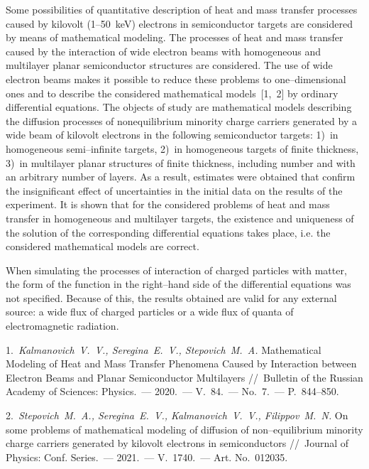 

\vzmscaption


Some possibilities of quantitative description of heat and mass transfer processes caused by kilovolt (1--50~keV) electrons in semiconductor targets are considered by means of ma\-the\-ma\-ti\-cal modeling. The processes of heat and mass transfer cau\-sed by the interaction of wide electron beams with homogeneous and multilayer planar semiconductor structures are considered. The use of wide electron beams makes it possible to reduce these problems to one--dimensional ones and to describe the con\-si\-de\-red mathematical models~[1,~2] by ordinary differential equations. The objects of study are mathematical models des\-cri\-bing the diffusion processes of nonequilibrium minority cha\-rge carriers generated by a wide beam of kilovolt electrons in the following semiconductor targets: 1)~in homogeneous semi--in\-fi\-nite targets, 2)~in homogeneous targets of finite thickness, 3)~in multilayer planar structures of finite thickness, including number and with an arbitrary number of layers. As a result, estimates were ob\-tai\-ned that confirm the insignificant effect of un\-cer\-tain\-ties in the initial data on the results of the experiment. It is shown that for the considered problems of heat and mass transfer in homogeneous and multilayer targets, the existence and uni\-que\-ness of the solution of the corresponding differential equations takes place, i.e. the considered mathematical models are correct.

When simulating the processes of interaction of char\-ged particles with matter, the form of the function in the right--hand side of the differential equations was not specified. Because of this, the results obtained are valid for any external source: a wide flux of charged particles or a wide flux of quanta of electromagnetic radiation.


\litlist


1.~{\it Kalmanovich~V.~V., Seregina~E.~V., Stepovich~M.~A.} Mathematical Modeling of Heat and Mass Transfer Phenomena Caused by Interaction between Electron Beams and Planar Semiconductor Multilayers //~Bulletin of the Russian Academy of Sciences: Physics.~--- 2020.~--- V.~84.~--- No.~7.~--- P.~844--850.

2.~{\it Stepovich~M.~A., Seregina~E.~V., Kalmanovich~V.~V., Filippov~M.~N.} On some problems of mathematical modeling of diffusion of non--equilibrium minority charge carriers generated by kilovolt electrons in semiconductors //~Journal of Physics: Conf. Series.~--- 2021.~--- V.~1740.~--- Art. No.~012035.
